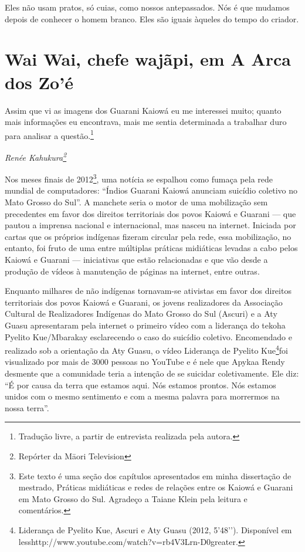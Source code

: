 Eles não usam pratos, só cuias, como nossos antepassados. Nós é que
mudamos depois de conhecer o homem branco. Eles são iguais àqueles do
tempo do criador.

\section{Wai Wai, chefe wajãpi, em A Arca dos Zo’é}

Assim que vi as imagens dos Guarani Kaiowá eu me interessei muito;
quanto mais informações eu encontrava, mais me sentia determinada a
trabalhar duro para analisar a questão.\footnote{Tradução livre, a
partir de entrevista realizada pela autora.}

\begin{flushright}
\emph{Renée Kahukura\footnote{Repórter da M\=aori Television}}
\end{flushright}

Nos meses finais de 2012\footnote{Este texto é uma seção dos capítulos
apresentados em minha dissertação de mestrado, Práticas midiáticas e
redes de relações entre os Kaiowá e Guarani em Mato Grosso do Sul.
Agradeço a Taiane Klein pela leitura e comentários.}, uma notícia se
espalhou como fumaça pela rede mundial de computadores: ``Índios Guarani
Kaiowá anunciam suicídio coletivo no Mato Grosso do Sul''. A manchete
seria o motor de uma mobilização sem precedentes em favor dos direitos
territoriais dos povos Kaiowá e Guarani — que pautou a imprensa
nacional e internacional, mas nasceu na internet. Iniciada por cartas
que os próprios indígenas fizeram circular pela rede, essa mobilização,
no entanto, foi fruto de uma entre múltiplas práticas midiáticas
levadas a cabo pelos Kaiowá e Guarani — iniciativas que estão
relacionadas e que vão desde a produção de vídeos à manutenção de
páginas na internet, entre outras. 

Enquanto milhares de não indígenas tornavam-se ativistas em favor dos
direitos territoriais dos povos Kaiowá e Guarani, os jovens
realizadores da Associação Cultural de Realizadores Indígenas do Mato
Grosso do Sul (Ascuri) e a Aty Guasu apresentaram pela internet o
primeiro vídeo com a liderança do tekoha Pyelito Kue/Mbarakay
esclarecendo o caso do suicídio coletivo. Encomendado e realizado sob a
orientação da Aty Guasu, o vídeo Liderança de Pyelito
Kue\footnote{Liderança de Pyelito Kue, Ascuri e Aty Guasu (2012,
5’48’’). Disponível em
{less}http://www.youtube.com/watch?v=rb4V3Lrn-D0{greater}.}foi
visualizado por mais de 3000 pessoas no YouTube e é nele que Apykaa
Rendy desmente que a comunidade teria a intenção de se suicidar
coletivamente. Ele diz: ``É por causa da terra que estamos aqui. Nós
estamos prontos. Nós estamos unidos com o mesmo sentimento e com a
mesma palavra para morrermos na nossa terra''.

